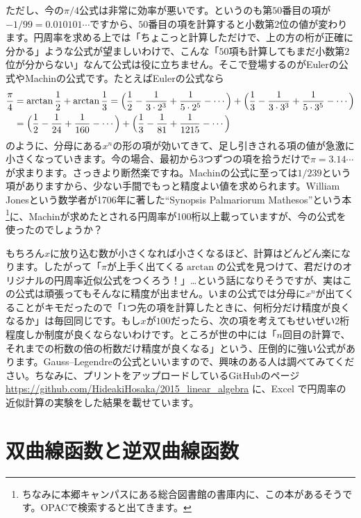 ただし、今の$\pi/4$公式は非常に効率が悪いです。というのも第$50$番目の項が$-1/99 = 0.010101\cdots$ですから、$50$番目の項を計算すると小数第$2$位の値が変わります。円周率を求める上では「ちょこっと計算しただけで、上の方の桁が正確に分かる」ような公式が望ましいわけで、こんな「$50$項も計算してもまだ小数第$2$位が分からない」なんて公式は役に立ちません。そこで登場するのがEulerの公式やMachinの公式です。たとえばEulerの公式なら
\begin{align*}
\frac{\pi}{4}
&= \arctan \frac{1}{2} + \arctan \frac{1}{3}
= \Bigl(\frac{1}{2} - \frac{1}{3\cdot 2^3} + \frac{1}{5\cdot 2^5} - \cdots\Bigr)
+ \Bigl(\frac{1}{3} - \frac{1}{3\cdot 3^3} + \frac{1}{5\cdot 3^5} - \cdots\Bigr) \\
&= \Bigl(\frac{1}{2} - \frac{1}{24} + \frac{1}{160} - \cdots\Bigr)
+ \Bigl(\frac{1}{3} - \frac{1}{81} + \frac{1}{1215} - \cdots\Bigr)
\end{align*}
のように、分母にある$x^n$の形の項が効いてきて、足し引きされる項の値が急激に小さくなっていきます。今の場合、最初から$3$つずつの項を拾うだけで$\pi=3.14\cdots$が求まります。さっきより断然楽ですね。Machinの公式に至っては$1/239$という項がありますから、少ない手間でもっと精度よい値を求められます。William Jonesという数学者が1706年に著した``Synopsis Palmariorum Mathesos''という本\footnote{ちなみに本郷キャンパスにある総合図書館の書庫内に、この本があるそうです。OPACで検索すると出てきます。}に、Machinが求めたとされる円周率が100桁以上載っていますが、今の公式を使ったのでしょうか？

もちろん$x$に放り込む数が小さくなれば小さくなるほど、計算はどんどん楽になります。したがって「$\pi$が上手く出てくる$\arctan$の公式を見つけて、君だけのオリジナルの円周率近似公式をつくろう！」…という話になりそうですが、実はこの公式は頑張ってもそんなに精度が出ません。いまの公式では分母に$x^n$が出てくることがキモだったので「$1$つ先の項を計算したときに、何桁分だけ精度が良くなるか」は毎回同じです。もし$x$が$100$だったら、次の項を考えてもせいぜい$2$桁程度しか制度が良くならないわけです。ところが世の中には「$n$回目の計算で、それまでの桁数の倍の桁数だけ精度が良くなる」という、圧倒的に強い公式があります。Gauss--Legendreの公式といいますので、興味のある人は調べてみてください。ちなみに、プリントをアップロードしているGitHubのページ \url{https://github.com/HideakiHosaka/2015_linear_algebra} に、Excel で円周率の近似計算の実験をした結果を載せています。

\section{双曲線函数と逆双曲線函数}

